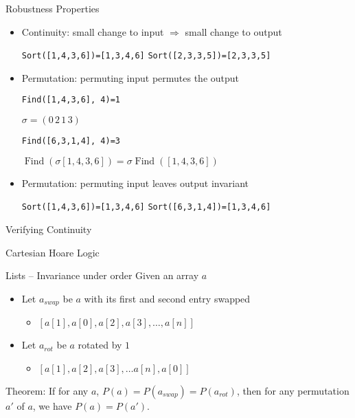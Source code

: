\documentclass[usenames,dvipsnames]{beamer}
\begin{document}
\begin{frame}[fragile]{Robustness Properties}
    \begin{itemize}[<+->]
        \item Continuity: small change to input \(\Rightarrow\) small change to output
        \begin{center}
            \verb!Sort([1,4,3,6])=[1,3,4,6]!
            \verb!Sort([2,3,3,5])=[2,3,3,5]!
        \end{center}
    \item Permutation: permuting input permutes the output
        \begin{center}
            \verb!Find([1,4,3,6], 4)=1!

            \(\sigma = (0\,2\,1\,3)\)

            \verb!Find([6,3,1,4], 4)=3!
            
            \(\operatorname{Find}(\sigma[1,4,3,6]) = \sigma\operatorname{Find}([1,4,3,6])\)
        \end{center}
    \item Permutation: permuting input leaves output invariant
        \begin{center}
            \verb!Sort([1,4,3,6])=[1,3,4,6]!
            \verb!Sort([6,3,1,4])=[1,3,4,6]!
        \end{center}
    \end{itemize}
\end{frame}

\begin{frame}{Verifying Continuity}
\end{frame}

\begin{frame}{Cartesian Hoare Logic}
\end{frame}

\begin{frame}[fragile]{Lists -- Invariance under order}
  Given an array $a$
  \begin{itemize}
    \item Let $a_{swap}$ be $a$ with its first and second entry swapped
    \begin{itemize}
      \item $[ a[1], a[0], a[2], a[3], \ldots, a[n] ]$
    \end{itemize}
    \item Let $a_{rot}$ be $a$ rotated by $1$
    \begin{itemize}
      \item $[ a[1], a[2], a[3], \ldots  a[n], a[0] ]$
    \end{itemize}
  \end{itemize}
  \vfill
  Theorem: If for any $a$, $P(a) = P(a_{swap}) = P(a_{rot})$,
  then for any permutation $a'$ of $a$,
  we have $P(a) = P(a')$.
\end{frame}
\end{document}
